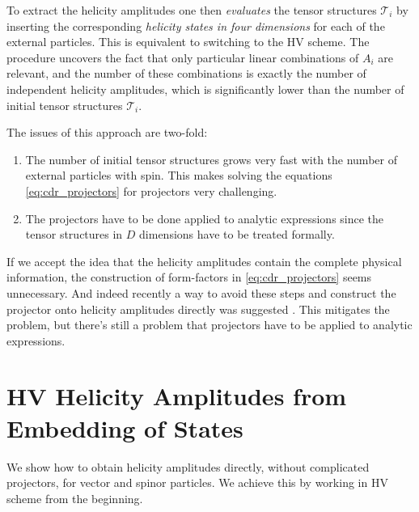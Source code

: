 To extract the helicity amplitudes one then \textit{evaluates} the tensor structures $\mathcal{T}_i$ 
by inserting the corresponding \textit{helicity states in four dimensions} for each of the external particles. 
This is equivalent to switching to the HV scheme.
The procedure uncovers the fact that only particular linear combinations of $A_i$ are relevant,
and the number of these combinations is exactly the number of independent helicity amplitudes, which is
significantly lower than the number of initial tensor structures $\mathcal{T}_i$.

The issues of this approach are two-fold:
\begin{enumerate}
  \item The number of initial tensor structures grows very fast with the number of external particles with spin.
    This makes solving the equations \cref{eq:cdr_projectors} for projectors very challenging.
  \item The projectors have to be done applied to analytic expressions since the tensor structures in $D$ dimensions have to be treated formally.
\end{enumerate}

If we accept the idea that the helicity amplitudes contain the complete physical information, 
the construction of form-factors in  \cref{eq:cdr_projectors} seems unnecessary.
And indeed recently a way to avoid these steps and construct the projector onto helicity amplitudes directly was suggested \cite{Peraro:2019cjj}.
This mitigates the problem, but there's still a problem that projectors have to be applied to analytic expressions.





\section{HV Helicity Amplitudes from Embedding of States}
\label{sec:helampl_embeding}

We show how to obtain helicity amplitudes directly, without complicated projectors, for vector and spinor particles.
We achieve this by working in HV scheme from the beginning.

